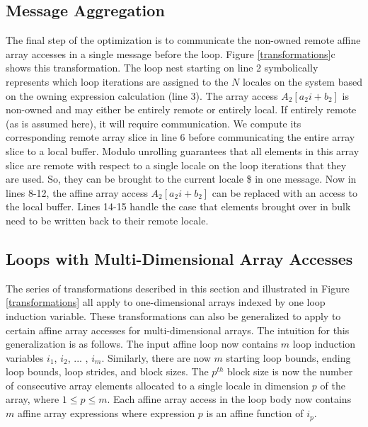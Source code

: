 \subsection{Message Aggregation}\label{subsec:message_aggregation}

The final step of the optimization is to communicate the non-owned remote affine array accesses in a single message before the loop. Figure \ref{transformations}c shows this transformation. The loop nest starting on line 2 symbolically represents which loop iterations are assigned to the $N$ locales on the system based on the owning expression calculation (line 3). The array access $A_{2}[a_{2}i+b_{2}]$ is non-owned and may either be entirely remote or entirely local. If entirely remote (as is assumed here), it will require communication. We compute its corresponding remote array slice in line 6 before communicating the entire array slice to a local buffer. Modulo unrolling guarantees that all elements in this array slice are remote with respect to a single locale on the loop iterations that they are used. So, they can be brought to the current locale \$ in one message. Now in lines 8-12, the affine array access $A_{2}[a_{2}i+b_{2}]$ can be replaced with an access to the local buffer. Lines 14-15 handle the case that elements brought over in bulk need to be written back to their remote locale. 

\subsection{Loops with Multi-Dimensional Array Accesses}\label{subsec:multi_dimensional}

The series of transformations described in this section and illustrated in Figure \ref{transformations} all apply to one-dimensional arrays indexed by one loop induction variable. These transformations can also be generalized to apply to certain affine array accesses for multi-dimensional arrays. The intuition for this generalization is as follows. The input affine loop now contains $m$ loop induction variables $i_{1}$, $i_{2}$, ... , $i_{m}$. Similarly, there are now $m$ starting loop bounds, ending loop bounds, loop strides, and block sizes. The $p^{th}$ block size is now the number of consecutive array elements allocated to a single locale in dimension $p$ of the array, where $1 \le p \le m$. Each affine array access in the loop body now contains $m$ affine array expressions where expression $p$ is an affine function of $i_{p}$. 

